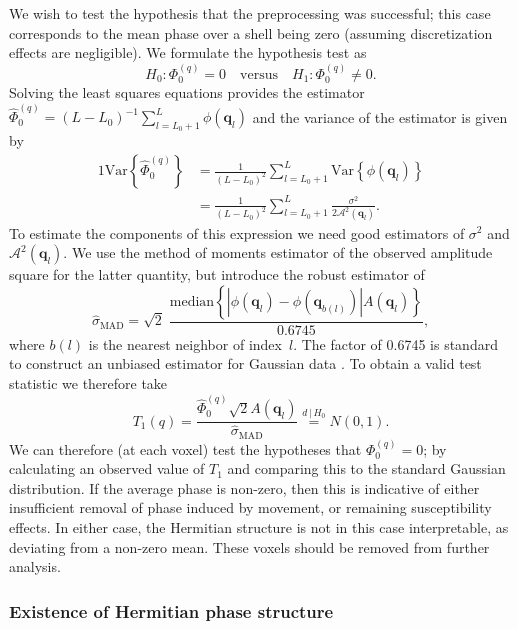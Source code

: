\documentclass[authoryear,preprint,12pt]{elsarticle}
\newcommand{\var}{\text{Var}}
\newcommand{\q}{\mathbf{q}}
\newcommand{\cA}{\mathcal{A}}
\newcommand{\wh}[1]{\widehat{#1}}
\begin{document}
We wish to test the hypothesis that the preprocessing was successful;
this case corresponds to the mean phase over a shell being zero
(assuming discretization effects are negligible).  We formulate the
hypothesis test as
\begin{equation}
  H_0: \Phi_0^{(q)} = 0 \quad \text{versus} \quad H_1: \Phi_0^{(q)}
  \neq 0.
\end{equation}
Solving the least squares equations provides the estimator
$\wh{\Phi}_0^{(q)}=(L-L_0)^{-1}\sum_{l=L_0+1}^{L}\phi(\q_l)$ and the
variance of the estimator is given by
\begin{alignat}{1}
  \var\left\{\wh{\Phi}_0^{(q)}\right\} &= \frac{1}{(L-L_0)^2}
  \sum_{l=L_0+1}^{L} \var\left\{\phi(\q_l)\right\}\\
  &= \frac{1}{(L-L_0)^2} \sum_{l=L_0+1}^{L}
  \frac{\sigma^2}{2\cA^2(\q_l)}.
\end{alignat}
To estimate the components of this expression we need good estimators
of $\sigma^2$ and $\cA^2(\q_l)$.  We use the method of moments
estimator of the observed amplitude square for the latter quantity,
but introduce the robust estimator of
\begin{equation}
  \hat{\sigma}_{\text{MAD}} = \sqrt{2} \; \frac{{\text{median}} 
    \left\{\left|\phi(\q_l) - \phi(\q_{b(l)})\right|
    A(\q_l)\right\}}{0.6745},
\end{equation}
where $b(l)$ is the nearest neighbor of index~$l$.  The factor of
0.6745 is standard to construct an unbiased estimator for Gaussian
data \citep{Hoaglin}.  To obtain a valid test statistic we therefore
take
\begin{equation}
  T_1(q) = \frac{\wh{\Phi}_0^{(q)}\sqrt{2}A(\q_l)}
  {\hat{\sigma}_{\text{MAD}}} \overset{d\,|\,H_0}{=} N(0,1).
\end{equation}
We can therefore (at each voxel) test the hypotheses that
$\Phi_0^{(q)}=0$; by calculating an observed value of $T_1$ and
comparing this to the standard Gaussian distribution.  If the average
phase is non-zero, then this is indicative of either insufficient
removal of phase induced by movement, or remaining susceptibility
effects.  In either case, the Hermitian structure is not in this case
interpretable, as deviating from a non-zero mean.  These voxels should
be removed from further analysis.

\subsubsection{Existence of Hermitian phase structure}
\end{document}
